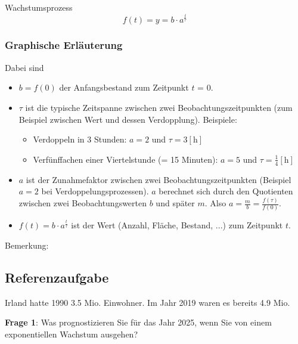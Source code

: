 \begin{definition}{Wachstumsprozess}{}
  $$f(t) = y = b\cdot{}a^{\frac{t}{\tau}}$$
\end{definition}

\subsubsection{Graphische Erläuterung}



Dabei sind
\begin{itemize}
\item $b=f(0)$ der Anfangsbestand zum Zeitpunkt $t$ = 0.
\item $\tau$ ist die typische Zeitspanne zwischen zwei Beobachtungszeitpunkten (zum Beispiel zwischen Wert und dessen Verdopplung). Beispiele:
  \begin{itemize}
  \item Verdoppeln in 3 Stunden: $a=2$ und $\tau = 3 [\textrm{h}]$
  \item Verfünffachen einer Viertelstunde (= 15 Minuten): $a=5$ und
    $\tau=\frac{1}{4} [\textrm{h}]$
  \end{itemize}
\item $a$ ist der Zunahmefaktor zwischen zwei Beobachtungszeitpunkten (Beispiel $a=2$ bei Verdoppelungsprozessen).
  $a$ berechnet sich durch den Quotienten zwischen zwei Beobachtungswerten $b$ und später $m$. Also $a=\frac{m}b=\frac{f(\tau)}{f(0)}$.
\item $f(t)=b\cdot{}a^{\frac{t}{\tau}}$ ist der Wert (Anzahl, Fläche,
  Bestand, ...) zum Zeitpunkt
  $t$. 
\end{itemize}

Bemerkung: 

\newpage

\subsection{Referenzaufgabe}
Irland hatte 1990 3.5 Mio. Einwohner. Im Jahr 2019 waren es bereits 4.9 Mio.

\textbf{Frage 1}: Was prognostizieren Sie für das Jahr 2025, wenn Sie von einem exponentiellen Wachstum ausgehen?

